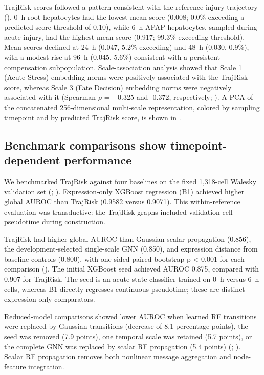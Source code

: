 TrajRisk scores followed a pattern consistent with the reference injury trajectory (). 0~h root hepatocytes had the lowest mean score (0.008; 0.0\% exceeding a predicted-score threshold of 0.10), while 6~h APAP hepatocytes, sampled during acute injury, had the highest mean score (0.917; 99.3\% exceeding threshold). Mean scores declined at 24~h (0.047, 5.2\% exceeding) and 48~h (0.030, 0.9\%), with a modest rise at 96~h (0.045, 5.6\%) consistent with a persistent compensation subpopulation. Scale-association analysis showed that Scale 1 (Acute Stress) embedding norms were positively associated with the TrajRisk score, whereas Scale 3 (Fate Decision) embedding norms were negatively associated with it (Spearman \ensuremath{\rho} = +0.325 and -0.372, respectively; ). A PCA of the concatenated 256-dimensional multi-scale representation, colored by sampling timepoint and by predicted TrajRisk score, is shown in .


\subsection*{Benchmark comparisons show timepoint-dependent performance}

We benchmarked TrajRisk against four baselines on the fixed 1,318-cell Walesky validation set (; ). Expression-only XGBoost \cite{ref048} regression (B1) achieved higher global AUROC than TrajRisk (0.9582 versus 0.9071). This within-reference evaluation was transductive: the TrajRisk graphs included validation-cell pseudotime during construction.

TrajRisk had higher global AUROC than Gaussian scalar propagation (0.856), the development-selected single-scale GNN (0.850), and expression distance from baseline controls (0.800), with one-sided paired-bootstrap p < 0.001 for each comparison (). The initial XGBoost seed achieved AUROC 0.875, compared with 0.907 for TrajRisk. The seed is an acute-state classifier trained on 0~h versus 6~h cells, whereas B1 directly regresses continuous pseudotime; these are distinct expression-only comparators.

Reduced-model comparisons showed lower AUROC when learned RF transitions were replaced by Gaussian transitions (decrease of 8.1 percentage points), the seed was removed (7.9 points), one temporal scale was retained (5.7 points), or the complete GNN was replaced by scalar RF propagation (5.4 points) (; ). Scalar RF propagation removes both nonlinear message aggregation and node-feature integration.


